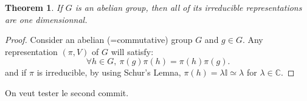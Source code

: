 \documentclass[11pt,a4paper]{article}
\newtheorem*{theorem}{Theorem}
\theoremstyle{definition}
\numberwithin{equation}{section}
\begin{document}
\begin{theorem}
    If $G$ is an abelian group, then all of its irreducible representations are one dimensionnal.
\end{theorem}
\begin{proof}
    Consider an abelian (=commutative) group $G$ and $g \in G$.
    Any representation $(\pi,V)$ of $G$ will satisfy:
    \begin{equation*}
       \forall h \in G,\  \pi(g) \pi(h) = \pi(h) \pi(g).
    \end{equation*}
and if $\pi$ is irreducible, by using Schur's Lemna, $\pi(h) = \lambda \mathbb{I} \simeq \lambda$ for $\lambda \in \mathbb{C}$.
\end{proof}
On veut tester le second commit.
\end{document}
